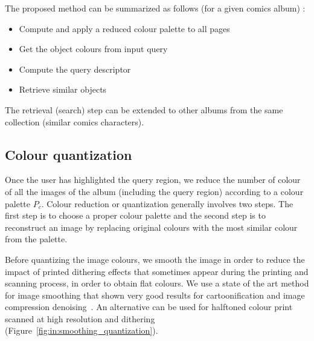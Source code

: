 The proposed method can be summarized as follows (for a given comics album) :
\begin{itemize}
  \item Compute and apply a reduced colour palette to all pages
  \item Get the object colours from input query
  \item Compute the query descriptor
  \item Retrieve similar objects
\end{itemize}

The retrieval (search) step can be extended to other albums from the same collection (similar comics characters).
 


\subsection{Colour quantization}
Once the user has highlighted the query region, we reduce the number of colour of all the images of the album (including the query region) according to a colour palette $P_c$.
Colour reduction or quantization generally involves two steps.
The first step is to choose a proper colour palette and the second step is to reconstruct an image by replacing original colours with the most similar colour from the palette.


Before quantizing the image colours, we smooth the image in order to reduce the impact of printed dithering effects that sometimes appear during the printing and scanning process, in order to obtain flat colours.
We use a state of the art method for image smoothing that shown very good results for cartoonification and image compression denoising~\cite{l0smoothing2011}.
An alternative can be used for halftoned colour print scanned at high resolution and dithering~\cite{Kopf2012DigitalReconstruction} (Figure~\ref{fig:in:smoothing_quantization}).

